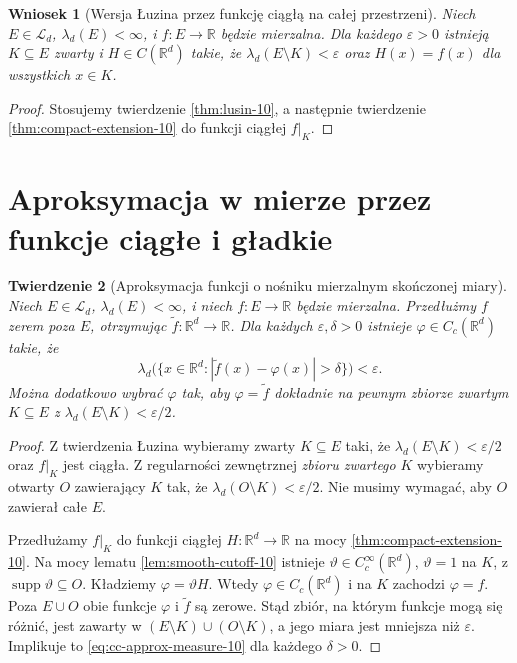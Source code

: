 \documentclass[11pt,a4paper,oneside]{book}
\numberwithin{equation}{chapter}
\theoremstyle{plain}
\newtheorem{twierdzenie}{Twierdzenie}[chapter]
\newtheorem{wniosek}[twierdzenie]{Wniosek}
\theoremstyle{definition}
\theoremstyle{remark}
\begin{document}
\begin{wniosek}[Wersja Łuzina przez funkcję ciągłą na całej przestrzeni]
\label{cor:lusin-extension-10}
Niech $E\in\mathcal L_d$, $\lambda_d(E)<\infty$,
i $f:E\to\mathbb R$ będzie mierzalna. Dla każdego
$\varepsilon>0$ istnieją $K\subseteq E$ zwarty
i $H\in C(\mathbb R^d)$ takie, że
$\lambda_d(E\setminus K)<\varepsilon$ oraz
$H(x)=f(x)$ dla wszystkich $x\in K$.
\end{wniosek}
\begin{proof}
Stosujemy twierdzenie \ref{thm:lusin-10},
a następnie twierdzenie \ref{thm:compact-extension-10}
do funkcji ciągłej $f|_K$.
\end{proof}

\section{Aproksymacja w mierze przez funkcje ciągłe i gładkie}

\begin{twierdzenie}[Aproksymacja funkcji o nośniku mierzalnym skończonej miary]
\label{thm:cc-approx-in-measure-10}
Niech $E\in\mathcal L_d$, $\lambda_d(E)<\infty$,
i niech $f:E\to\mathbb R$ będzie mierzalna.
Przedłużmy $f$ zerem poza $E$, otrzymując
$\widetilde f:\mathbb R^d\to\mathbb R$.
Dla każdych $\varepsilon,\delta>0$ istnieje
$\varphi\in C_c(\mathbb R^d)$ takie, że
\begin{equation}\label{eq:cc-approx-measure-10}
\lambda_d\bigl(\{x\in\mathbb R^d:
|\widetilde f(x)-\varphi(x)|>\delta\}\bigr)
<\varepsilon.
\end{equation}
Można dodatkowo wybrać $\varphi$ tak, aby
$\varphi=\widetilde f$ \emph{dokładnie} na pewnym
zbiorze zwartym $K\subseteq E$ z
$\lambda_d(E\setminus K)<\varepsilon/2$.
\end{twierdzenie}
\begin{proof}
Z twierdzenia Łuzina wybieramy zwarty
$K\subseteq E$ taki, że
$\lambda_d(E\setminus K)<\varepsilon/2$
oraz $f|_K$ jest ciągła.
Z regularności zewnętrznej \emph{zbioru zwartego}
$K$ wybieramy otwarty $O$ zawierający $K$ tak,
że $\lambda_d(O\setminus K)<\varepsilon/2$.
Nie musimy wymagać, aby $O$ zawierał całe $E$.

Przedłużamy $f|_K$ do funkcji ciągłej
$H:\mathbb R^d\to\mathbb R$ na mocy
\ref{thm:compact-extension-10}. Na mocy lematu
\ref{lem:smooth-cutoff-10} istnieje
$\vartheta\in C_c^\infty(\mathbb R^d)$, $\vartheta=1$ na $K$,
z $\operatorname{supp}\vartheta\subseteq O$.
Kładziemy $\varphi=\vartheta H$. Wtedy
$\varphi\in C_c(\mathbb R^d)$ i na $K$ zachodzi
$\varphi=f$. Poza $E\cup O$ obie funkcje
$\varphi$ i $\widetilde f$ są zerowe. Stąd
zbiór, na którym funkcje mogą się różnić,
jest zawarty w $(E\setminus K)\cup(O\setminus K)$,
a jego miara jest mniejsza niż $\varepsilon$.
Implikuje to \eqref{eq:cc-approx-measure-10}
dla każdego $\delta>0$.
\end{proof}
\end{document}
